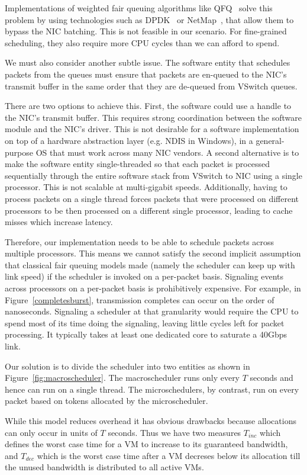 Implementations of weighted fair queuing algorithms like QFQ~\cite{qfq} solve
this problem by using technologies such as DPDK~\cite{dpdk} or
NetMap~\cite{netmap}, that allow them to bypass the NIC batching.  This is not
feasible in our scenario. For fine-grained scheduling, they also require more
CPU cycles than we can afford to spend.

We must also consider another subtle issue.  The software entity that
schedules packets from the queues must ensure that packets are en-queued to the
NIC's transmit buffer in the same order that they are de-queued from VSwitch
queues.  

There are two options to achieve this. First, the software could use a handle to
the NIC's transmit buffer.  This requires strong coordination between the
software module and the NIC's driver.  This is not desirable for a software
implementation on top of a hardware abstraction layer (e.g. NDIS in Windows), 
in a general-purpose OS that must work across many NIC vendors. A second
alternative is to make the software entity single-threaded so that each packet
is processed sequentially through the entire software stack from VSwitch to NIC
using a single processor. This is not scalable at multi-gigabit speeds.
Additionally, having to process packets on a single thread forces packets that
were processed on different processors to be then processed on a different
single processor, leading to cache misses which increase latency.  

Therefore,
our implementation needs to be able to schedule packets across multiple processors.  This
means we cannot satisfy the second implicit assumption that classical 
fair queuing models made (namely the scheduler can keep up with link speed) if the scheduler
 is invoked on a per-packet basis.  Signaling events across processors on a per-packet basis is prohibitively expensive.
For example, in Figure~\ref{completesburst}, transmission completes can occur on the order of
nanoseconds.  Signaling a scheduler at that granularity would require the CPU to spend
most of its time doing the signaling, leaving little cycles left for packet processing.  
It typically takes at least one dedicated core to saturate a 40Gbps link. 

Our solution is to divide the scheduler into two entities as shown in
Figure~\ref{fig:macroscheduler}.   The macroscheduler runs only every $T$
seconds and hence can run on a single thread.   The microschedulers, by
contrast, run on every packet based on tokens allocated by the microscheduler.   

While this model reduces overhead it has obvious drawbacks because allocations
can only occur in units of $T$ seconds.   Thus we have two measures $T_{inc}$
which defines the worst case time for a VM to increase to its guaranteed
bandwidth, and $T_{dec}$ which is the worst case time after a VM decreses below
its allocation till the unused bandwidth is distributed to all active VMs. 
